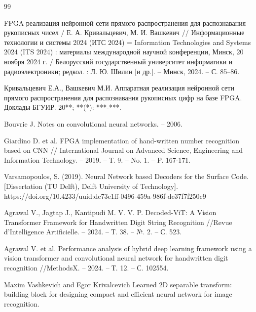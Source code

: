 \begin{thebibliography}{99}
    \setlength{\itemindent}{1.95cm} %
    \setlength{\leftmargin}{1.25cm} %
    \setlength{\labelsep}{2mm} %

    \raggedright%
    \justifying
     FPGA реализация нейронной сети прямого распространения для распознавания рукописных чисел / Е. А. Кривальцевич, М. И. Вашкевич // Информационные технологии и системы 2024 (ИТС 2024) = Information Technologies and Systems 2024 (ITS 2024) : материалы международной научной конференции, Минск, 20 ноября 2024 г. / Белорусский государственный университет информатики и радиоэлектроники; редкол. : Л. Ю. Шилин [и др.]. – Минск, 2024. – С. 85–86.
    
     Кривальцевич Е.А., Вашкевич М.И. Аппаратная реализация нейронной сети прямого распространения для распознавания рукописных цифр на базе FPGA. Доклады БГУИР. 20**; **(*): ***-***.
    
     Bouvrie J. Notes on convolutional neural networks. – 2006.
    
     Giardino D. et al. FPGA implementation of hand-written number recognition based on CNN // International Journal on Advanced Science, Engineering and Information Technology. – 2019. – Т. 9. – No. 1. – P. 167-171. 
    
     Varsamopoulos, S. (2019). Neural Network based Decoders for the Surface Code. [Dissertation (TU Delft), Delft University of Technology]. https://doi.org/10.4233/uuid:dc73e1ff-0496-459a-986f-de37f7f250c9
    
     Agrawal V., Jagtap J., Kantipudi M. V. V. P. Decoded-ViT: A Vision Transformer Framework for Handwritten Digit String Recognition //Revue d'Intelligence Artificielle. – 2024. – Т. 38. – №. 2. – С. 523.
    
     Agrawal V. et al. Performance analysis of hybrid deep learning framework using a vision transformer and convolutional neural network for handwritten digit recognition //MethodsX. – 2024. – Т. 12. – С. 102554.
    
     Maxim Vashkevich and Egor Krivalcevich Learned 2D separable transform: building block for designing compact and efficient neural network for image recognition.
    

\end{thebibliography}
